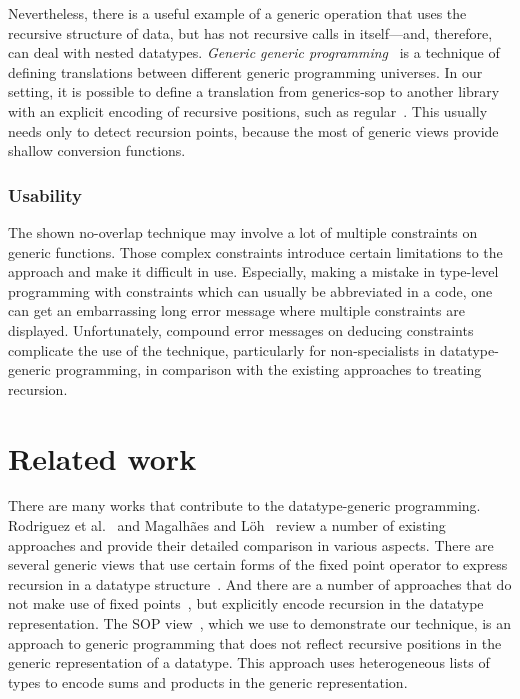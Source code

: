 \documentclass[runningheads]{llncs}
\begin{document}
Nevertheless, there is a useful example of a generic operation that uses the recursive structure of data, but has not recursive calls in itself---and, therefore, can deal with nested datatypes. \emph{Generic generic programming}~\cite{MagLoeh2014} is a technique of defining translations between different generic programming universes. In our setting, it is possible to define a translation from \textsf{generics-sop} to another library with an explicit encoding of recursive positions, such as \textsf{regular}~\cite{VanNoort2008}. This usually needs only to detect recursion points, because the most of generic views provide shallow conversion functions.

\subsubsection{Usability}

The shown no-overlap technique may involve a lot of multiple constraints on generic functions. Those complex constraints introduce certain limitations to the approach and make it difficult in use. Especially, making a mistake in type-level programming with constraints which can usually be abbreviated in a code, one can get an embarrassing long error message where multiple constraints are displayed. Unfortunately, compound error messages on deducing constraints complicate the use of the technique, particularly for non-specialists in datatype-generic programming, in comparison with the existing approaches to treating recursion.


\section{Related work}
\label{sec:related-work}

There are many works that contribute to the datatype-generic programming. Rodriguez et al.~\cite{Rodriguez2008} and Magalh{\~{a}}es and L{\"{o}}h~\cite{MagLoeh2012} review a number of existing approaches and provide their detailed comparison in various aspects. There are several generic views that use certain forms of the fixed point operator to express recursion in a datatype structure~\cite{VanNoort2008,MuRec2009,Jansson1997,Loeh2011}. And there are a number of approaches that do not make use of fixed points~\cite{Chakravarty2009,Cheney2002,Magalhaes2010,Weirich2006}, but explicitly encode recursion in the datatype representation. The SOP view~\cite{VriLoeh2014}, which we use to demonstrate our technique, is an approach to generic programming that does not reflect recursive positions in the generic representation of a datatype. This approach uses heterogeneous lists of types to encode sums and products in the generic representation.
\end{document}
